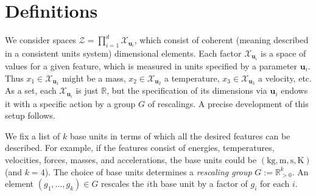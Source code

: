 \documentclass[twoside,11pt]{article}
\newcommand{\unit}[1]{\mathrm{#1}}
\newcommand{\kg}{\unit{kg}}
\newcommand{\m}{\unit{m}}
\newcommand{\s}{\unit{s}}
\newcommand{\K}{\unit{K}}
\newcommand{\J}{\unit{J}}
\begin{document}
\section{Definitions}


We consider spaces $\mathcal Z = \prod_{i=1}^d \mathcal X_{\mathbf u_i}$, which consist of coherent (meaning described in a consistent units system) dimensional elements. Each factor $\mathcal X_{\mathbf u_i}$ is a space of values for a given feature, which is measured in units specified by a parameter $\mathbf u_i$. Thus $x_1\in \mathcal X_{\mathbf u_1}$ might be a mass, $x_2\in \mathcal X_{\mathbf u_2}$ a temperature, $x_3\in \mathcal X_{\mathbf u_3}$ a velocity, etc. As a set, each $\mathcal X_{\mathbf u_i}$ is just $\mathbb R$, but the specification of its dimensions via $\mathbf u_i$ endows it with a specific action by a group $G$ of rescalings. A precise development of this setup follows.

We fix a list of $k$ base units in terms of which all the desired features can be described. For example, if the features consist of energies, temperatures, velocities, forces, masses, and accelerations, the base units could be $(\kg, \m, \s, \K)$ (and $k=4$). The choice of base units determines a {\em rescaling group} $G := \mathbb R_{>0}^k$. An element $(g_1,\dots,g_k)\in G$ rescales the $i$th base unit by a factor of $g_i$ for each $i$.
\end{document}
